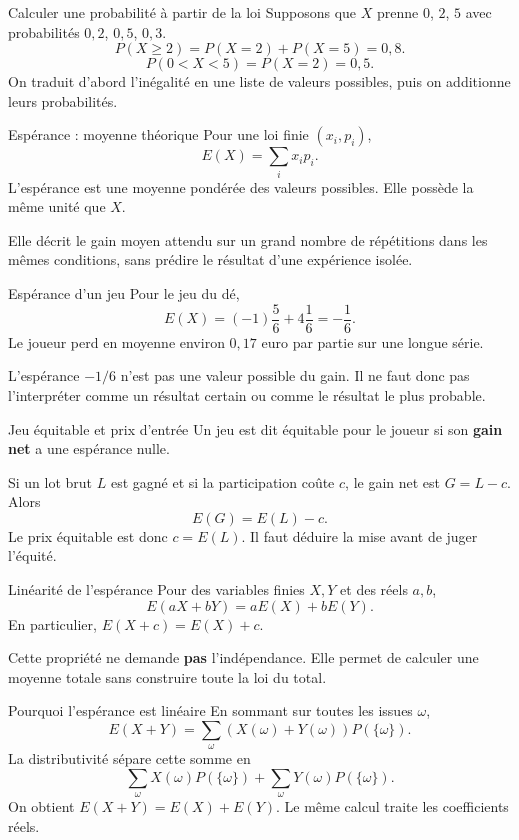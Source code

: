 \documentclass[aspectratio=169,12pt]{beamer}
\begin{document}
\renewcommand{\slidekind}{MÉTHODE \& EXEMPLE}
\begin{frame}[t,fragile]{Calculer une probabilité à partir de la loi}
Supposons que $X$ prenne $0$, $2$, $5$ avec probabilités $0,2$, $0,5$, $0,3$.\[P(X\ge2)=P(X=2)+P(X=5)=0,8.\]\[P(0<X<5)=P(X=2)=0,5.\]On traduit d’abord l’inégalité en une liste de valeurs possibles, puis on additionne leurs probabilités.
\end{frame}
\renewcommand{\slidekind}{COMPRENDRE}
\begin{frame}[t,fragile]{Espérance : moyenne théorique}
Pour une loi finie $(x_i,p_i)$,\[\boxed{E(X)=\sum_i x_i p_i}.\]L’espérance est une moyenne pondérée des valeurs possibles. Elle possède la même unité que $X$.\medskip\par Elle décrit le gain moyen attendu sur un grand nombre de répétitions dans les mêmes conditions, sans prédire le résultat d’une expérience isolée.
\end{frame}
\renewcommand{\slidekind}{COMPRENDRE}
\begin{frame}[t,fragile]{Espérance d’un jeu}
Pour le jeu du dé,\[E(X)=(-1)\frac56+4\frac16=-\frac16.\]Le joueur perd en moyenne environ $0,17$ euro par partie sur une longue série.\medskip\par L’espérance $-1/6$ n’est pas une valeur possible du gain. Il ne faut donc pas l’interpréter comme un résultat certain ou comme le résultat le plus probable.
\end{frame}
\renewcommand{\slidekind}{COMPRENDRE}
\begin{frame}[t,fragile]{Jeu équitable et prix d’entrée}
Un jeu est dit équitable pour le joueur si son \textbf{gain net} a une espérance nulle.\medskip\par Si un lot brut $L$ est gagné et si la participation coûte $c$, le gain net est $G=L-c$. Alors\[E(G)=E(L)-c.\]Le prix équitable est donc $c=E(L)$. Il faut déduire la mise avant de juger l’équité.
\end{frame}
\renewcommand{\slidekind}{COMPRENDRE}
\begin{frame}[t,fragile]{Linéarité de l’espérance}
Pour des variables finies $X,Y$ et des réels $a,b$,\[\boxed{E(aX+bY)=aE(X)+bE(Y)}.\]En particulier, $E(X+c)=E(X)+c$.\medskip\par Cette propriété ne demande \textbf{pas} l’indépendance. Elle permet de calculer une moyenne totale sans construire toute la loi du total.
\end{frame}
\renewcommand{\slidekind}{JUSTIFIER}
\begin{frame}[t,fragile]{Pourquoi l’espérance est linéaire}
En sommant sur toutes les issues $\omega$,\[E(X+Y)=\sum_{\omega}(X(\omega)+Y(\omega))P(\{\omega\}).\]La distributivité sépare cette somme en\[\sum_{\omega}X(\omega)P(\{\omega\})+\sum_{\omega}Y(\omega)P(\{\omega\}).\]On obtient $E(X+Y)=E(X)+E(Y)$. Le même calcul traite les coefficients réels.
\end{frame}
\end{document}
